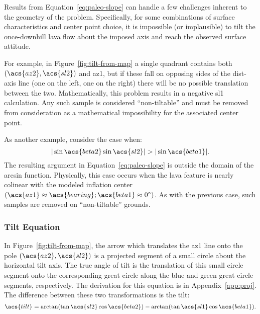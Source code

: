 Results from Equation~\eqref{eq:paleo-slope} can handle a few challenges inherent to the geometry of the problem. Specifically, for some combinations of surface characteristics and center point choice, it is impossible (or implausible) to tilt the once-downhill lava flow about the imposed axis and reach the observed surface attitude. 

For example, in Figure~\ref{fig:tilt-from-map} a single quadrant contains both $\left(\acs{az2},\acs{sl2}\right)$ and \acs{az1}, but if these fall on opposing sides of the \acs{dist}-axis line (one on the left, one on the right) there will be no possible translation between the two. Mathematically, this problem results in a negative \acf{sl1} calculation. Any such sample is considered ``non-tiltable'' and must be removed from consideration as a mathematical impossibility for the associated center point.

As another example, consider the case when:
\begin{equation}
     |\sin\acs{beta2}\sin\acs{sl2}| > |\sin\acs{beta1}|.\label{eq:domain-error}
\end{equation}
The resulting argument in Equation~\eqref{eq:paleo-slope} is outside the domain of the arcsin function. Physically, this case occurs when the lava feature is nearly colinear with the modeled inflation center $(\acs{az1}\approx\acs{bearing}; \acs{beta1}\approx\ang{0})$. As with the previous case, such samples are removed on ``non-tiltable'' grounds.


\subsubsection{Tilt Equation}\label{sec:map-tilt-equation}

In Figure~\ref{fig:tilt-from-map}, the arrow which translates the \acs{az1} line onto the pole $\left(\acs{az2},\acs{sl2}\right)$ is a projected segment of a small circle about the horizontal tilt axis. The true angle of tilt is the translation of this small circle segment onto the corresponding great circle along the blue and green great circle segments, respectively. The derivation for this equation is in Appendix~\ref{app:proj}. The difference between these two transformations is the tilt:
\begin{equation}
    \acs{tilt} = \arctan(\tan\acs{sl2}\cos\acs{beta2}) - \arctan(\tan\acs{sl1}\cos\acs{beta1}).\label{eq:tilt-from-map}
\end{equation}

